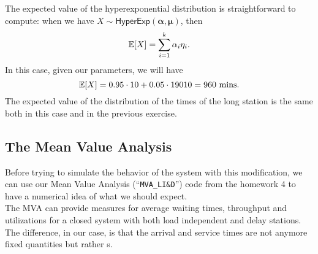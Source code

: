\documentclass[12pt]{article}
\begin{document}
The expected value of the hyperexponential distribution is straightforward to compute: when we have $X\sim\mathsf{HyperExp}(\mathbf{\alpha},\mathbf{\mu})$, then
\begin{equation*}
	\mathbb{E}[X]=\sum_{i=1}^{k}\alpha_i\eta_i.
\end{equation*}
In this case, given our parameters, we will have
\begin{equation*}
	\mathbb{E}[X]=0.95\cdot 10+0.05\cdot19010=960\text{ mins}.
\end{equation*}
The expected value of the distribution of the times of the long station is the same both in this case and in the previous exercise. \\
\subsection{The Mean Value Analysis}
Before trying to simulate the behavior of the system with this modification, we can use our Mean Value Analysis (``\verb*|MVA_LI&D|'') code from the homework 4 to have a numerical idea of what we should expect.\\
The MVA can provide measures for average waiting times, throughput and utilizations for a closed system with both load independent and delay stations. The difference, in our case, is that the arrival and service times are not anymore fixed quantities but rather \rv s.
\end{document}
